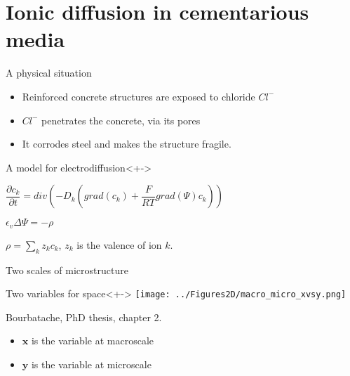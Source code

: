 \section{Ionic diffusion in cementarious media}

\begin{frame}
%
\begin{block}{A physical situation}
\begin{itemize}%
\item<+-> Reinforced concrete structures are exposed to chloride $Cl^-$
\item<+-> $Cl^-$ penetrates the concrete, via its pores
\item<+-> It corrodes steel and makes the structure fragile.
\end{itemize}
\end{block}
%
\begin{block}{A model for electrodiffusion}<+->
\begin{description}
\item<+-> [The Nernst-Planck equation] $\dfrac{\partial{c_k}}{\partial{t}}=div\left(-D_k\left(grad(c_k)+\dfrac{F}{RT}grad(\Psi)c_k\right)\right)$
\item<+-> [Poisson equation] $\epsilon_v \Delta \Psi=-\rho$
\item<+-> [] $\displaystyle \rho=\sum\limits_k z_k c_k$, $z_k$ is the valence of ion $k$.
\end{description}
\end{block}
%
\end{frame}

\begin{frame}{Two scales of microstructure}
%
\begin{block}{Two variables for space}<+->
%
\texttt{[image: ../Figures2D/macro\_micro\_xvsy.png]}

\par
Bourbatache, PhD thesis, chapter 2.
%
\begin{itemize}
\item<+-> $\mathbf{x}$ is the variable at macroscale
\item<+-> $\mathbf{y}$ is the variable at microscale
\end{itemize}
%
\end{block}
%
\end{frame}

